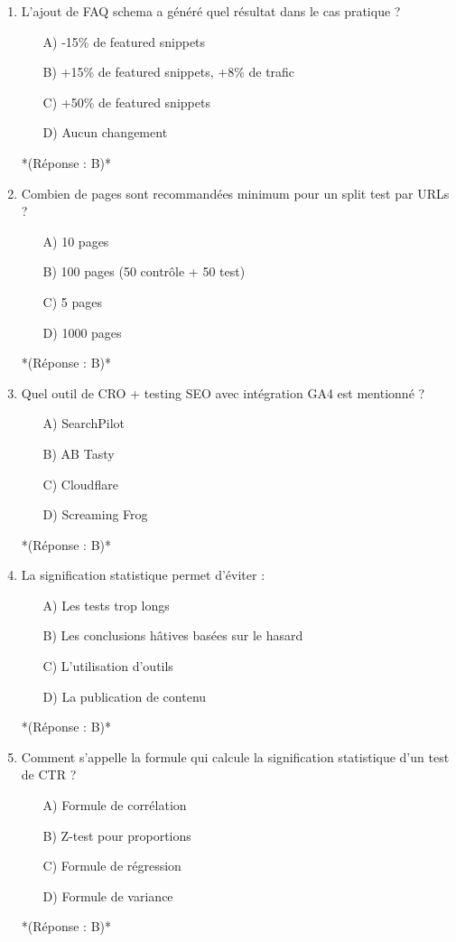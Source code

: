 \documentclass[12pt,a4paper,twoside]{report}
\begin{document}
\begin{enumerate}
    \item L'ajout de FAQ schema a généré quel résultat dans le cas pratique ?
    \begin{itemize}
        \item[A)] -15\% de featured snippets
        \item[B)] +15\% de featured snippets, +8\% de trafic
        \item[C)] +50\% de featured snippets
        \item[D)] Aucun changement
    \end{itemize}
    *(Réponse : B)*

    \item Combien de pages sont recommandées minimum pour un split test par URLs ?
    \begin{itemize}
        \item[A)] 10 pages
        \item[B)] 100 pages (50 contrôle + 50 test)
        \item[C)] 5 pages
        \item[D)] 1000 pages
    \end{itemize}
    *(Réponse : B)*

    \item Quel outil de CRO + testing SEO avec intégration GA4 est mentionné ?
    \begin{itemize}
        \item[A)] SearchPilot
        \item[B)] AB Tasty
        \item[C)] Cloudflare
        \item[D)] Screaming Frog
    \end{itemize}
    *(Réponse : B)*

    \item La signification statistique permet d'éviter :
    \begin{itemize}
        \item[A)] Les tests trop longs
        \item[B)] Les conclusions hâtives basées sur le hasard
        \item[C)] L'utilisation d'outils
        \item[D)] La publication de contenu
    \end{itemize}
    *(Réponse : B)*

    \item Comment s'appelle la formule qui calcule la signification statistique d'un test de CTR ?
    \begin{itemize}
        \item[A)] Formule de corrélation
        \item[B)] Z-test pour proportions
        \item[C)] Formule de régression
        \item[D)] Formule de variance
    \end{itemize}
    *(Réponse : B)*


\end{enumerate}
\end{document}

